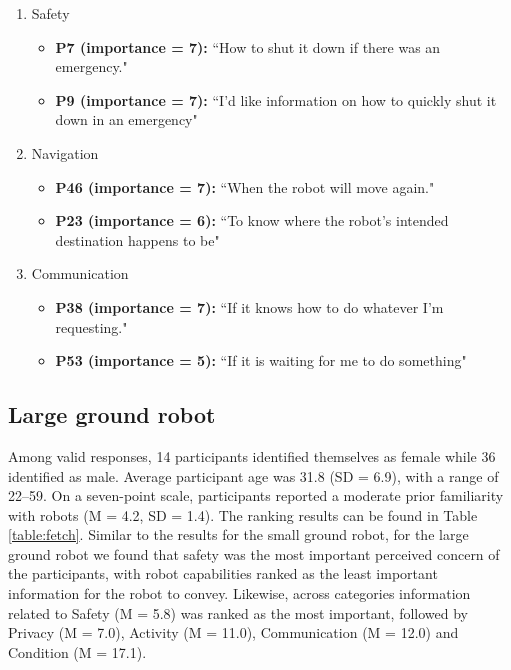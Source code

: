 \documentclass[letterpaper, 10 pt, conference]{ieeeconf}  %
\begin{document}
\begin{enumerate}
\item Safety
    \begin{itemize}
        \item  \textbf{P7 (importance = 7):} ``How to shut it down if there was an emergency."
        \item  \textbf{P9 (importance = 7):} ``I'd like information on how to quickly shut it down in an emergency"
    \end{itemize}
    
\item Navigation
    \begin{itemize}
        \item  \textbf{P46 (importance = 7):} ``When the robot will move again."
        \item  \textbf{P23 (importance = 6):} ``To know where the robot's intended destination happens to be"

    \end{itemize}

\item Communication
    \begin{itemize}
        \item  \textbf{P38 (importance = 7):} ``If it knows how to do whatever I'm requesting."
        \item  \textbf{P53 (importance = 5):} ``If it is waiting for me to do something"
    \end{itemize}
    
\end{enumerate}

\subsection{Large ground robot}
Among valid responses, 14 participants identified themselves as female while 36 identified as male. Average participant age was 31.8 (SD = 6.9), with a range of 22--59. On a seven-point scale, participants reported a moderate prior familiarity with robots (M = 4.2, SD = 1.4). The ranking results can be found  in Table \ref{table:fetch}. Similar to the results for the small ground robot, for the large ground robot we found that safety was the most important perceived concern of the participants, with robot capabilities ranked as the least important information for the robot to convey. Likewise, across categories information related to Safety (M = 5.8) was ranked as the most important, followed by Privacy (M = 7.0), Activity (M = 11.0), Communication (M = 12.0) and Condition (M = 17.1).
\end{document}
